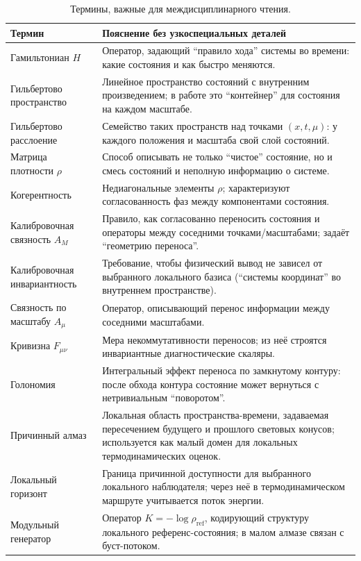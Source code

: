 \documentclass[11pt,a4paper]{article}
\theoremstyle{definition}
\theoremstyle{plain}
\theoremstyle{remark}
\begin{document}
\begin{table}[H]
\centering
\caption{Термины, важные для междисциплинарного чтения.}
\label{tab:appendix_c_terms}
\small
\begin{tabular}{@{}p{3.6cm}p{10.4cm}@{}}
\toprule
Термин & Пояснение без узкоспециальных деталей \\
\midrule
Гамильтониан $H$ & Оператор, задающий ``правило хода'' системы во времени: какие состояния и как быстро меняются. \\
Гильбертово пространство & Линейное пространство состояний с внутренним произведением; в работе это ``контейнер'' для состояния на каждом масштабе. \\
Гильбертово расслоение & Семейство таких пространств над точками $(x,t,\mu)$: у каждого положения и масштаба свой слой состояний. \\
Матрица плотности $\rho$ & Способ описывать не только ``чистое'' состояние, но и смесь состояний и неполную информацию о системе. \\
Когерентность & Недиагональные элементы $\rho$; характеризуют согласованность фаз между компонентами состояния. \\
Калибровочная связность $A_M$ & Правило, как согласованно переносить состояния и операторы между соседними точками/масштабами; задаёт ``геометрию переноса''. \\
Калибровочная инвариантность & Требование, чтобы физический вывод не зависел от выбранного локального базиса (``системы координат'' во внутреннем пространстве). \\
Связность по масштабу $A_\mu$ & Оператор, описывающий перенос информации между соседними масштабами. \\
Кривизна $F_{\mu\nu}$ & Мера некоммутативности переносов; из неё строятся инвариантные диагностические скаляры. \\
Голономия & Интегральный эффект переноса по замкнутому контуру: после обхода контура состояние может вернуться с нетривиальным ``поворотом''. \\
Причинный алмаз & Локальная область пространства-времени, задаваемая пересечением будущего и прошлого световых конусов; используется как малый домен для локальных термодинамических оценок. \\
Локальный горизонт & Граница причинной доступности для выбранного локального наблюдателя; через неё в термодинамическом маршруте учитывается поток энергии. \\
Модульный генератор & Оператор $K=-\log\rho_{\mathrm{ref}}$, кодирующий структуру локального референс-состояния; в малом алмазе связан с буст-потоком. \\

\end{tabular}
\end{table}
\end{document}
